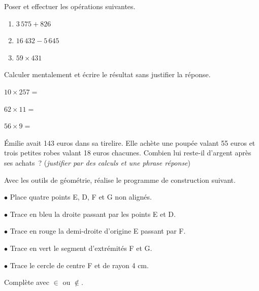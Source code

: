 \documentclass{article}
\begin{document}
\sf
\def\completerule{\hdashrule[0.1ex][x]{1 cm}{0.5pt}{0.5mm}}
\def\dotedline{\hdashrule[0.1ex][x]{\linewidth}{0.5pt}{0.5mm}}
\par\bigskip\noindent
Poser et effectuer les opérations suivantes.
\begin{enumerate}[label=\alph*), font=\bfseries]
    \item $3\,575+826$
    \item $16\,432-5\,645$
    \item $59\times431$
\end{enumerate}
\par\bigskip\noindent
Calculer mentalement et écrire le résultat sans justifier la réponse.\par\noindent
$10\times257=$\par\noindent
$62\times11=$\par\noindent
$56\times9=$
\par\bigskip\noindent
Émilie avait 143 euros dans sa tirelire. Elle achète une poupée valant 55
euros et trois petites robes valant 18 euros chacunes. Combien lui reste-il d'argent
après ses achats~? ({\itshape justifier par des calculs et une phrase réponse})
\par\bigskip\noindent
Avec les outils de géométrie, réalise le programme de construction suivant.
\begin{mdframed}[%
    outerlinewidth=2,%
    backgroundcolor = yellow!50!black!30!white%
    ]%
    $\bullet$ Place quatre points E, D, F et G non alignés.\par\noindent
    $\bullet$ Trace en bleu la droite passant par les points E et D.\par\noindent
    $\bullet$ Trace en rouge la demi-droite d'origine E passant par F.\par\noindent
    $\bullet$ Trace en vert le segment d'extrémités F et G.\par\noindent
    $\bullet$ Trace le cercle de centre F et de rayon 4 cm.
\end{mdframed}
\par\bigskip\noindent
\noindent Complète avec $\in$ ou $\notin$.\par\vskip10pt\noindent
{}
\end{document}
